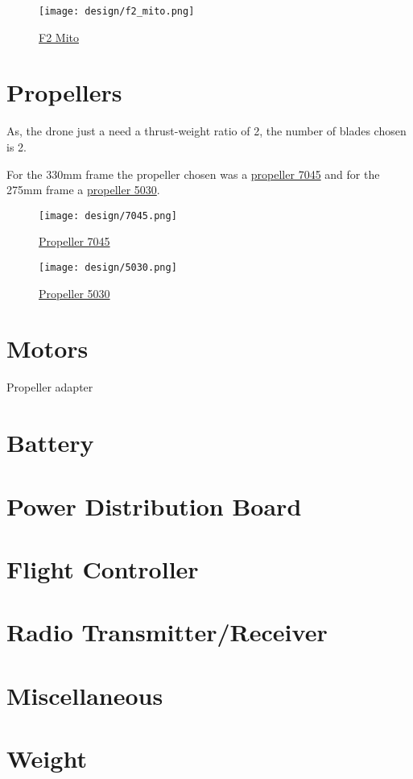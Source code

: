 \begin{figure}[!ht]
    \centering
    \texttt{[image: design/f2\_mito.png]}
    \caption{\href{https://www.banggood.com/F2-Mito-GS-Carbon-Fiber-195220250275mm-Freestyle-Stretch-X-Frame-Kit-for-RC-FPV-Racing-Drone-p-1319168.html?rmmds=search&ID=532758&cur_warehouse=CN}{F2 Mito}}
    \label{fig:f2mito}
\end{figure}

\section{Propellers}

As, the drone just a need a thrust-weight ratio of 2, the number of blades chosen is 2.

For the 330mm frame the propeller chosen was a \hyperref[fig:7045]{propeller 7045} and for the 275mm frame a \hyperref[fig:5030]{propeller 5030}.

\begin{figure}[!ht]
    \centering
    \texttt{[image: design/7045.png]}
    \caption{\href{https://www.banggood.com/Style-7050-7x5-DD-Direct-Drive-Propeller-Blade-CW-CCW-For-RC-Airplane-p-1045332.html?rmmds=search&ID=45905&cur_warehouse=CN}{Propeller 7045}}
    \label{fig:7045}
\end{figure}

\begin{figure}[!ht]
    \centering
    \texttt{[image: design/5030.png]}
    \caption{\href{https://www.banggood.com/2pcs-WSX-5030-53-Inch-ABS-Propeller-White-CWCCW-for-RC-Drone-FPV-Racing-Multirotors-p-1387499.html?rmmds=search&cur_warehouse=CN}{Propeller 5030}}
    \label{fig:5030}
\end{figure}

\section{Motors}

Propeller adapter

\section{Battery}

\section{Power Distribution Board}

\section{Flight Controller}

\section{Radio Transmitter/Receiver}

\section{Miscellaneous}

\section{Weight}
